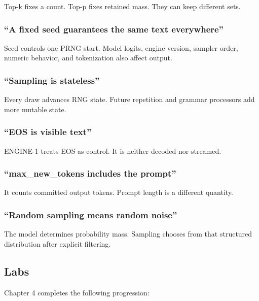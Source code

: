 \documentclass[
  10pt,
]{article}
\begin{document}
Top-k fixes a count. Top-p fixes retained mass. They can keep different
sets.

\subsubsection{``A fixed seed guarantees the same text
everywhere''}\label{a-fixed-seed-guarantees-the-same-text-everywhere}

Seed controls one PRNG start. Model logits, engine version, sampler
order, numeric behavior, and tokenization also affect output.

\subsubsection{``Sampling is stateless''}\label{sampling-is-stateless}

Every draw advances RNG state. Future repetition and grammar processors
add more mutable state.

\subsubsection{``EOS is visible text''}\label{eos-is-visible-text}

ENGINE-1 treats EOS as control. It is neither decoded nor streamed.

\subsubsection{``max\_new\_tokens includes the
prompt''}\label{max_new_tokens-includes-the-prompt}

It counts committed output tokens. Prompt length is a different
quantity.

\subsubsection{``Random sampling means random
noise''}\label{random-sampling-means-random-noise}

The model determines probability mass. Sampling chooses from that
structured distribution after explicit filtering.

\subsection{Labs}\label{labs}

Chapter 4 completes the following progression:
\end{document}

